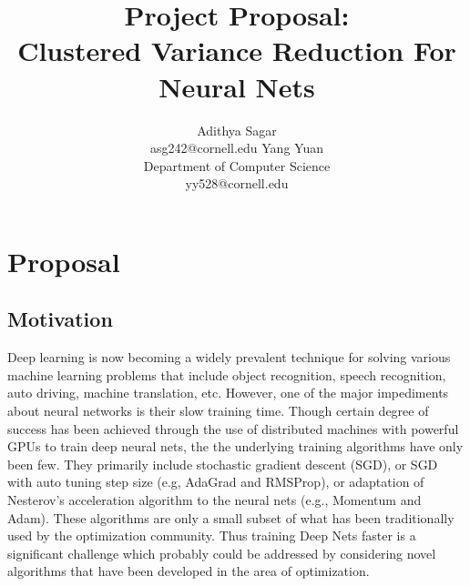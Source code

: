 \documentclass{article} %
\title{Project Proposal: \\Clustered Variance Reduction For Neural Nets}
\author{
Adithya Sagar\\
asg242@cornell.edu
\And
Yang Yuan  \\
Department of Computer Science\\
yy528@cornell.edu
}
\begin{document}
\maketitle


\section{Proposal}
\subsection{Motivation}
Deep learning is now becoming a widely prevalent technique for solving various machine learning problems that include object recognition, speech recognition, auto driving, machine translation, etc. 
However, one of the major impediments about neural networks is their slow training time. Though certain degree of success has been achieved through the use of distributed machines with powerful GPUs to train deep neural nets, the the underlying training algorithms have only been few. They primarily include stochastic gradient descent (SGD), or SGD with auto tuning step size (e.g, AdaGrad and RMSProp), or adaptation of Nesterov's acceleration algorithm to the neural nets (e.g., Momentum and Adam). %
These algorithms are only a small subset of what has been traditionally used by the optimization community. Thus training Deep Nets faster is a significant challenge which probably could be addressed by considering novel algorithms that have been developed in the area of optimization.  
\end{document}
